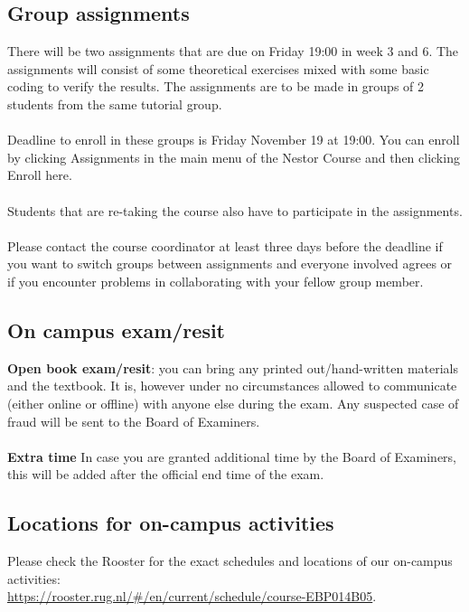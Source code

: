 \documentclass[openany]{article}
\begin{document}
\subsection{Group assignments}
There will be two assignments that are due on Friday
19:00 in week 3 and 6. The assignments will consist of some theoretical
exercises mixed with some basic coding to verify the results. The assignments
are to be made in groups of 2 students from the same tutorial group. \\~\\
Deadline
to enroll in these groups is Friday November 19 at 19:00. You can
enroll by clicking Assignments in the main menu of the Nestor Course and
then clicking Enroll here.\\~\\
Students that are re-taking the course also have to participate in
the assignments.\\~\\
Please contact the course coordinator at least three days before the deadline if 
you want to switch groups between assignments and everyone involved agrees or
if you encounter problems in collaborating with your fellow group member.  

\subsection{On campus exam/resit}
\textbf{Open book exam/resit}: you can bring any printed out/hand-written materials and the textbook. It is, however under no circumstances allowed to
communicate (either online or offline) with anyone else during the exam.
Any suspected case of fraud will be sent to the Board of Examiners.\\~\\
\textbf{Extra time } In case you are granted additional time by the Board of Examiners, this will be added after the official end time of the exam.

\subsection{Locations for on-campus activities}
Please check the Rooster for the exact schedules and locations of our on-campus activities:\\ \href{https://rooster.rug.nl/#/en/current/schedule/course-EBP014B05}{https://rooster.rug.nl/\#/en/current/schedule/course-EBP014B05}.
\end{document}
